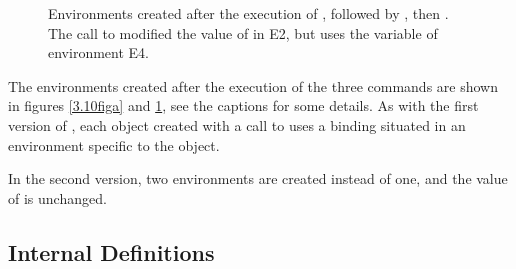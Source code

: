 \begin{exe}[3.10]
\begin{figure}
        \caption{Environments created after the execution of
        , followed by , then 
        . The call to  modified 
        the value of  in E2, but  uses the  
        variable of environment E4.}
        \label{3.10figb}
    \end{figure}

    The environments created after the execution of the three commands are shown 
    in figures \ref{3.10figa} and \ref{3.10figb}, see the captions for some 
    details. As with the first version of , each object 
    created with a call to  uses a  binding 
    situated in an environment specific to the object.

    In the second version, two environments are created instead of one, and the 
    value of  is unchanged.
\end{exe}

\subsection{Internal Definitions}

